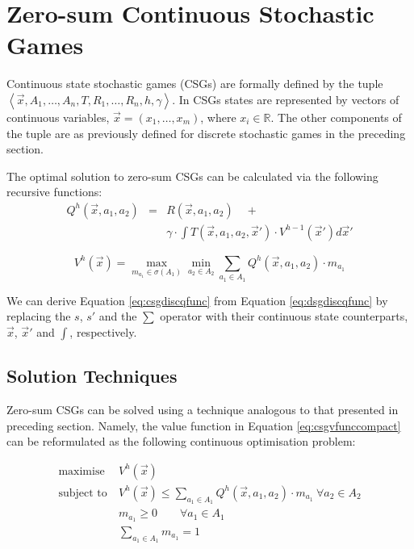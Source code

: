 \section{Zero-sum Continuous Stochastic Games}
\label{sec:csg}

Continuous state stochastic games (CSGs) are formally defined by the tuple
$ \left\langle \vec{x}, A_{1}, \ldots, A_{n}, T, R_{1}, \ldots, R_{n}, h, \gamma  \right\rangle$.
In CSGs states are represented by vectors of continuous variables, $\vec{x} = \left(x_1, \ldots, x_m \right)$, 
where $x_i \in \mathbb{R}$. The other components of the tuple are as 
previously defined for discrete stochastic games in the preceding section.

The optimal solution to zero-sum CSGs can be calculated via the 
following recursive functions:
{\small 
\begin{eqnarray}
\label{eq:csgdiscqfunc}
  Q^{h}(\vec{x}, a_1, a_2) &=& R(\vec{x}, a_1, a_2) \quad + \nonumber \\
  && \gamma \cdot \int T(\vec{x}, a_1, a_2, \vec{x}') \cdot V^{h-1}(\vec{x}') d\vec{x}' 
\end{eqnarray}
}%

{\small 
\begin{equation}
\label{eq:csgvfunccompact}
  V^{h}(\vec{x}) = \max_{m_{a_{1}} \in \sigma(A_1)} \min_{a_2 \in A_2} \sum_{a_1 \in A_1} Q^{h}(\vec{x}, a_1, a_2) \cdot m_{a_{1}}
\end{equation}
}%

We can derive Equation \eqref{eq:csgdiscqfunc} from Equation \eqref{eq:dsgdiscqfunc}
by replacing the $s$, $s'$ and the $\sum$ operator with their continuous
state counterparts, $\vec{x}$, $\vec{x}'$ and $\int$, respectively.
%

\subsection{Solution Techniques}

Zero-sum CSGs can be solved using a technique analogous to that 
presented in preceding section. Namely, the value function in Equation
\eqref{eq:csgvfunccompact} can be reformulated as the following continuous 
optimisation problem:

{\small 
\begin{subequations}
\begin{align}
\text{maximise} &\   V^{h}(\vec{x}) \nonumber \\
\text{subject to} &\   V^{h}(\vec{x}) \leq \sum_{a_1 \in A_1} Q^{h}(\vec{x}, a_1, a_2) \cdot m_{a_{1}} \   \forall a_2 \in A_2 \label{eq:bilinearconstraint} \\
                          &\   m_{a_{1}} \geq 0 \qquad \forall a_{1} \in A_1 \nonumber\\
                          &\   \sum_{a_{1} \in A_1} m_{a_{1}} = 1 \nonumber        
\end{align}
\end{subequations}
}%


